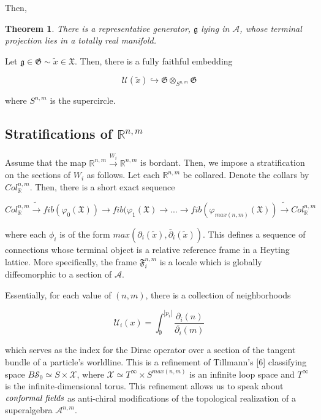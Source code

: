 \documentclass{article}
\newtheorem{tm}{Theorem}
\begin{document}
	Then,
	
	\begin{tm}
		There is a representative generator, $\mathfrak{g}$ lying in $\mathscr{A}$, whose terminal projection lies in a totally real manifold.
	\end{tm}
	
	Let $\mathfrak{g} \in \mathfrak{G} \sim \tilde{x} \in \mathfrak{X}$. Then, there is a fully faithful embedding 
	
	$$\mathcal{U}(\tilde{x}) \hookrightarrow \mathfrak{G} \otimes_{S^{n,m}} \mathfrak{G}$$
	
	where $S^{n,m}$ is the supercircle.
	
	\subsection{Stratifications of $\mathbb{R}^{n,m}$}
	
	Assume that the map $\mathbb{R}^{n,m} \xrightarrow{W_i} \mathbb{R}^{n,m}$ is bordant. Then, we impose a stratification on the sections of $W_i$ as follows. Let each $\mathbb{R}^{n,m}$ be collared. Denote the collars by $Col_\mathbb{R}^{n,m}$. Then, there is a short exact sequence
	
	$$Col_\mathbb{R}^{n,m} \tilde{\longrightarrow} fib(\varphi_0(\mathfrak{X})) \to fib(\varphi_1(\mathfrak{X}) \to ... \to fib(\varphi_{max(n,m)}(\mathfrak{X})) \tilde{\longrightarrow} Col_\mathbb{R}^{n,m}$$
	
	where each $\phi_i$ is of the form $max(\partial_i(\tilde{x}),\bar{\partial}_i(\tilde{x})).$ This defines a sequence of connections whose terminal object is a relative reference frame in a Heyting lattice. More specifically, the frame $\mathfrak{F}_i^{n,m}$ is a locale which is globally diffeomorphic to a section of $\mathscr{A}$.
	
	Essentially, for each value of $(n,m)$, there is a collection of neighborhoods
	
	$$\mathcal{U}_i(x) = \int_{\emptyset}^{|p_i|} \frac{\partial_i(n)}{\bar{\partial_i}(m)}$$
	
	which serves as the index for the Dirac operator over a section of the tangent bundle of a particle's worldline. This is a refinement of Tillmann's [6] classifying space $B\mathscr{S}_0 \simeq S \times \mathscr{X}$, where $\mathscr{X} \simeq T^\infty \times S^{max(n,m)}$ is an infinite loop space and $T^\infty$ is the infinite-dimensional torus. This refinement allows us to speak about $\emph{conformal fields}$ as anti-chiral modifications of the topological realization of a superalgebra $\mathcal{A}^{n,m}$.
	
\end{document}
